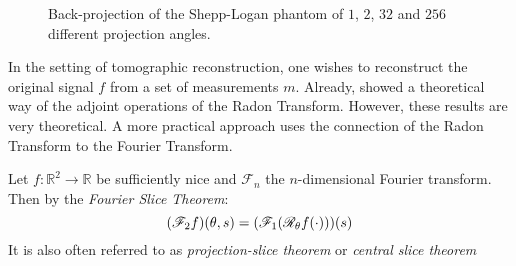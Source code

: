 \begin{figure}
	\centering
	\caption{Back-projection of the Shepp-Logan phantom of \(1\), \(2\), \(32\) and \(256\)
		different projection angles.}\label{fig:backprojection_shepp_logan}
\end{figure}

In the setting of tomographic reconstruction, one wishes to reconstruct the original signal \(f\)
from a set of measurements \(m\). Already, \citeauthor*{radon_uber_1917} showed a theoretical way of
the adjoint operations of the Radon Transform. However, these results are very theoretical. A more
practical approach uses the connection of the Radon Transform to the Fourier Transform.

\begin{definition}\label{def:fourier_slice_theorem}
	Let \(f\colon \mathbb{R}^2 \to \mathbb{R}\) be sufficiently nice and \(\mathscr{F}_n\) the
	\(n\)-dimensional Fourier transform. Then by the \textit{Fourier Slice Theorem}:
	\[ (\mathscr{F}_2f)(\theta, s) = (\mathscr{F}_1(\mathscr{R}_\theta f(\cdot)))(s) \]
	It is also often referred to as \textit{projection-slice theorem} or \textit{central slice theorem}
\end{definition}

